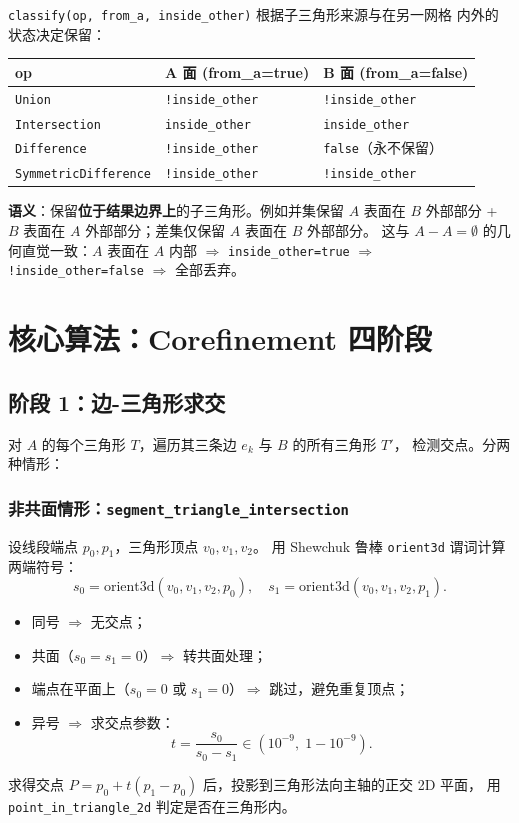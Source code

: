 \documentclass[11pt,a4paper]{article}
\begin{document}
\texttt{classify(op, from\_a, inside\_other)} 根据子三角形来源与在另一网格
内外的状态决定保留：

\begin{center}
\renewcommand{\arraystretch}{1.18}
\begin{tabular}{@{}lll@{}}
  \toprule
  \textbf{op} & \textbf{A 面 (from\_a=true)} & \textbf{B 面 (from\_a=false)} \\
  \midrule
  \texttt{Union}              & \texttt{!inside\_other} & \texttt{!inside\_other} \\
  \texttt{Intersection}       & \texttt{inside\_other}  & \texttt{inside\_other}  \\
  \texttt{Difference}         & \texttt{!inside\_other} & \texttt{false}（永不保留） \\
  \texttt{SymmetricDifference}& \texttt{!inside\_other} & \texttt{!inside\_other} \\
  \bottomrule
\end{tabular}
\end{center}

\textbf{语义}：保留\textbf{位于结果边界上}的子三角形。例如并集保留 $A$ 表面在
$B$ 外部部分 + $B$ 表面在 $A$ 外部部分；差集仅保留 $A$ 表面在 $B$ 外部部分。
这与 $A - A = \emptyset$ 的几何直觉一致：$A$ 表面在 $A$ 内部 $\Rightarrow$
\texttt{inside\_other=true} $\Rightarrow$ \texttt{!inside\_other=false} $\Rightarrow$ 全部丢弃。

\section{核心算法：Corefinement 四阶段}

\subsection{阶段 1：边-三角形求交}

对 $A$ 的每个三角形 $T$，遍历其三条边 $e_k$ 与 $B$ 的所有三角形 $T'$，
检测交点。分两种情形：

\subsubsection{非共面情形：\texttt{segment\_triangle\_intersection}}

设线段端点 $p_0, p_1$，三角形顶点 $v_0, v_1, v_2$。
用 Shewchuk 鲁棒 \texttt{orient3d} 谓词计算两端符号：
\[
  s_0 = \mathrm{orient3d}(v_0, v_1, v_2, p_0),\quad
  s_1 = \mathrm{orient3d}(v_0, v_1, v_2, p_1).
\]
\begin{itemize}
  \item 同号 $\Rightarrow$ 无交点；
  \item 共面（$s_0 = s_1 = 0$）$\Rightarrow$ 转共面处理；
  \item 端点在平面上（$s_0 = 0$ 或 $s_1 = 0$）$\Rightarrow$ 跳过，避免重复顶点；
  \item 异号 $\Rightarrow$ 求交点参数：
  \[
    t = \frac{s_0}{s_0 - s_1} \in (10^{-9},\; 1 - 10^{-9}).
  \]
\end{itemize}
求得交点 $P = p_0 + t(p_1 - p_0)$ 后，投影到三角形法向主轴的正交 2D 平面，
用 \texttt{point\_in\_triangle\_2d} 判定是否在三角形内。
\end{document}
